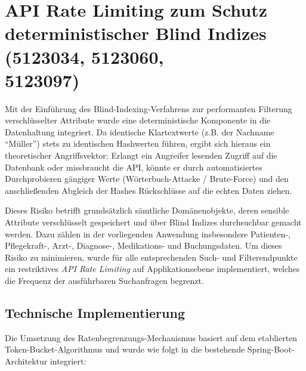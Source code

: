 \section{API Rate Limiting zum Schutz deterministischer Blind Indizes (5123034, 5123060, \\5123097)}

Mit der Einführung des Blind-Indexing-Verfahrens zur performanten Filterung verschlüsselter Attribute wurde eine deterministische Komponente in die Datenhaltung integriert. Da identische Klartextwerte (z.B. der Nachname "`Müller"') stets zu identischen Hashwerten führen, ergibt sich hieraus ein theoretischer Angriffsvektor: Erlangt ein Angreifer lesenden Zugriff auf die Datenbank oder missbraucht die API, könnte er durch automatisiertes Durchprobieren gängiger Werte (Wörterbuch-Attacke / Brute-Force) und den anschließenden Abgleich der Hashes Rückschlüsse auf die echten Daten ziehen.

Dieses Risiko betrifft grundsätzlich sämtliche Domänenobjekte, deren sensible Attribute verschlüsselt gespeichert und über Blind Indizes durchsuchbar gemacht werden. Dazu zählen in der vorliegenden Anwendung insbesondere Patienten-, Pflegekraft-, Arzt-, Diagnose-, Medikations- und Buchungsdaten. Um dieses Risiko zu minimieren, wurde für alle entsprechenden Such- und Filterendpunkte ein restriktives \textit{API Rate Limiting} auf Applikationsebene implementiert, welches die Frequenz der ausführbaren Suchanfragen begrenzt.

\subsection{Technische Implementierung}

Die Umsetzung des Ratenbegrenzungs-Mechanismus basiert auf dem etablierten Token-Bucket-Algorithmus und wurde wie folgt in die bestehende Spring-Boot-Architektur integriert:

